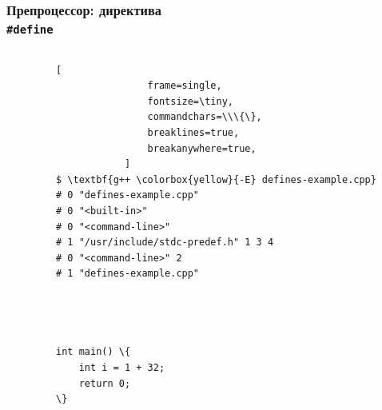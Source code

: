 \documentclass[compress]{beamer}
\begin{document}
\begin{frame}[fragile]

    \frametitle{Препроцессор: директива \\ \texttt{\#define}}

    \begin{columns}[T]

        \begin{column}{0.5\textwidth}


        \end{column}

        \begin{column}{0.5\textwidth}

            \begin{Verbatim}[
                frame=single,
                fontsize=\tiny,
                commandchars=\\\{\},
                breaklines=true,
                breakanywhere=true,
            ]
$ \textbf{g++ \colorbox{yellow}{-E} defines-example.cpp}
# 0 "defines-example.cpp"
# 0 "<built-in>"
# 0 "<command-line>"
# 1 "/usr/include/stdc-predef.h" 1 3 4
# 0 "<command-line>" 2
# 1 "defines-example.cpp"




int main() \{
    int i = 1 + 32;
    return 0;
\}
            \end{Verbatim}

        \end{column}

    \end{columns}

\end{frame}
\end{document}
